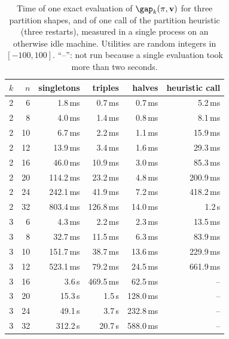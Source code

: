 \begin{table}[h]
\centering\small
\caption{Time of one exact evaluation of ${\gap}_k(\pi,\mathbf v)$ for three partition shapes, and of one call of the partition heuristic (three restarts), measured in a single process on an otherwise idle machine. Utilities are random integers in $[-100,100]$. ``--'': not run because a single evaluation took more than two seconds.}
\label{tab:scaling}
\begin{tabular}{rrrrrr}
\toprule
$k$ & $n$ & singletons & triples & halves & heuristic call \\
\midrule
2 & 6 & 1.8\,ms & 0.7\,ms & 0.7\,ms & 5.2\,ms \\
2 & 8 & 4.0\,ms & 1.4\,ms & 0.8\,ms & 8.1\,ms \\
2 & 10 & 6.7\,ms & 2.2\,ms & 1.1\,ms & 15.9\,ms \\
2 & 12 & 13.9\,ms & 3.4\,ms & 1.6\,ms & 29.3\,ms \\
2 & 16 & 46.0\,ms & 10.9\,ms & 3.0\,ms & 85.3\,ms \\
2 & 20 & 114.2\,ms & 23.2\,ms & 4.8\,ms & 200.9\,ms \\
2 & 24 & 242.1\,ms & 41.9\,ms & 7.2\,ms & 418.2\,ms \\
2 & 32 & 803.4\,ms & 126.8\,ms & 14.0\,ms & 1.2\,s \\
3 & 6 & 4.3\,ms & 2.2\,ms & 2.3\,ms & 13.5\,ms \\
3 & 8 & 32.7\,ms & 11.5\,ms & 6.3\,ms & 83.9\,ms \\
3 & 10 & 151.7\,ms & 38.7\,ms & 13.6\,ms & 229.9\,ms \\
3 & 12 & 523.1\,ms & 79.2\,ms & 24.5\,ms & 661.9\,ms \\
3 & 16 & 3.6\,s & 469.5\,ms & 62.5\,ms & -- \\
3 & 20 & 15.3\,s & 1.5\,s & 128.0\,ms & -- \\
3 & 24 & 49.1\,s & 3.7\,s & 232.8\,ms & -- \\
3 & 32 & 312.2\,s & 20.7\,s & 588.0\,ms & -- \\
\bottomrule
\end{tabular}
\end{table}
